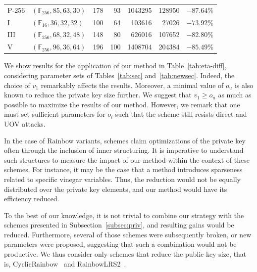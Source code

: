 \documentclass[english]{ufsc-thesis-rn46-2019/ufsc-thesis-rn46-2019}
\theoremstyle{definition}
\begin{document}
\begin{table}[htbp]
\begin{tabular}{*{2}{l}*{5}{r}}
    P-256    & $(\mathbb{F}_{256}, 85, 63, 30)$ & 178 & 93  &  \num{ 1043295}
      &          \num{ 128950} & $-87.64\%$ \\
    I        & $(\mathbb{F}_{ 16}, 36, 32, 32)$ & 100 & 64  &  \num{  103616}
      &          \num{  27026} & $-73.92\%$ \\
    III      & $(\mathbb{F}_{256}, 68, 32, 48)$ & 148 & 80  &  \num{  626016}
      &          \num{ 107652} & $-82.80\%$ \\
    V        & $(\mathbb{F}_{256}, 96, 36, 64)$ & 196 & 100 &  \num{ 1408704}
      &          \num{ 204384} & $-85.49\%$ \\
    \bottomrule
  \end{tabular}
\end{table}

We show results for the application of our method in Table~\ref{tab:eta-diff},
considering parameter sets of Tables~\ref{tab:sec}
and~\ref{tab:newsec}. Indeed, the choice of $v_{1}$ remarkably affects the
results. Moreover, a minimal value of $o_{u}$ is also known to reduce the
private key size further. We suggest that $v_{1} \geq o_{u}$ as much as
possible to maximize the results of our method. However, we remark that one
must set sufficient parameters for $o_{i}$ such that the scheme still resists
direct and UOV attacks.

In the case of Rainbow variants, schemes claim optimizations of the private key
often through the inclusion of inner structuring. It is imperative to
understand such structures to measure the impact of our method within the
context of these schemes. For instance, it may be the case that a method
introduces sparseness related to specific vinegar variables. Thus, the
reduction would not be equally distributed over the private key elements, and
our method would have its efficiency reduced.

To the best of our knowledge, it is not trivial to combine our strategy with
the schemes presented in Subsection~\ref{subsec:priv}, and resulting gains
would be reduced. Furthermore, several of those schemes were subsequently
broken, or new parameters were proposed, suggesting that such a combination
would not be productive. We thus consider only schemes that reduce the public
key size, that is, CyclicRainbow~\cite{Petzoldt:201012} and
RainbowLRS2~\cite[Sec.~9.2]{Petzoldt:201307}.
\end{document}
